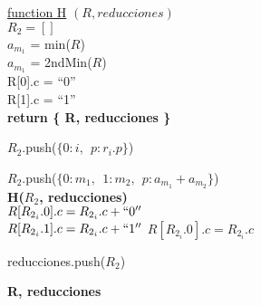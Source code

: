 \documentclass{article}
\begin{document}
\begin{algorithm}
  \underline{function H} $(R, reducciones)$ \\
  $R_2 = []$  \\
  $a_{m_1}$ = min($R$)  \\
  $a_{m_1}$ = 2ndMin($R$) \\

   {
    R[0].c = ``0'' \\
    R[1].c = ``1'' \\
    \textbf{return \{ R, reducciones \}}
  }

   {
     {
      $R_2$.push($\{ 0: i,\ \ p: r_i.p \}$)
    }
  }

  $R_2$.push($\{ 0: m_1,\ \ 1:m_2,\ \ p: a_{m_1} + a_{m_2} \}$) \\[2\baselineskip]

  \textbf{H($R_2$, reducciones)} \\[2\baselineskip]

   {
     {
      $R[R_{2_i}.0].c = R_{2_i}.c + ``0''$ \\
      $R[R_{2_i}.1].c = R_{2_i}.c + ``1''$
    }{
      $R[R_{2_i}.0].c = R_{2_i}.c$
    }
  }

  reducciones.push($R_2$)

  \textbf{ R, reducciones }
\end{algorithm}
\end{document}
